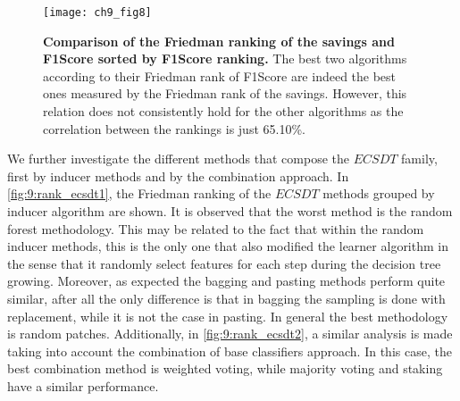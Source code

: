 {  \begin{figure}[t!]
  \centering
  \texttt{[image: ch9\_fig8]}
  \caption{\textbf{Comparison of the Friedman ranking of the savings and F1Score sorted by F1Score 
  ranking.} The best two algorithms according to their Friedman rank of F1Score are indeed the 
  best ones measured by the Friedman rank of the savings. However, this relation does not 
  consistently hold for the other algorithms as the correlation between the rankings is just 
  65.10\%.}
  \label{fig:9:friedman_vs_fscore}
  \end{figure}
  
  We further investigate the different methods that compose the $ECSDT$ family, first by inducer 
  methods and by the combination approach. In \figurename{ \ref{fig:9:rank_ecsdt1}}, the Friedman 
  ranking of the $ECSDT$ methods grouped by inducer algorithm are shown. It is observed that the 
  worst method is the random forest methodology. This may be related to the fact that within the 
  random inducer methods, this is the only one that also modified the learner algorithm in the 
  sense that it randomly select features for each step during the decision tree growing. Moreover, 
  as expected the bagging and pasting methods perform quite similar, after all the only difference 
  is that in bagging the sampling is done with replacement, while it is not the case in pasting. 
  In  general the best methodology is random patches. Additionally, in \figurename{ 
  \ref{fig:9:rank_ecsdt2}}, a similar analysis is made taking into account the combination of base 
  classifiers approach. In this case, the best combination method is weighted voting, while 
  majority voting and staking have a similar performance.

}
